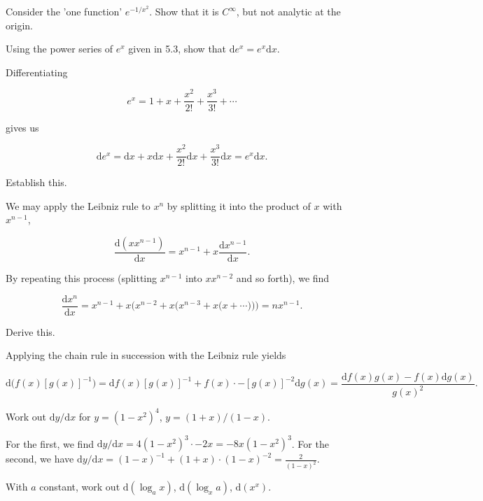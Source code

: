 \documentclass[../the-road-to-reality.tex]{subfiles}
\begin{document}
\begin{questions}
\question Consider the 'one function' $e^{-1/x^2}$. Show that it is $C^\infty$, but not analytic at the origin.

\question Using the power series of $e^x$ given in 5.3, show that $\mathrm{d}e^x = e^x\mathrm{d}x$.

\begin{solution}
	Differentiating
	
	\[
	e^x = 1 + x + \frac{x^2}{2!} + \frac{x^3}{3!} + \cdots
	\] 	

	gives us
	
	\[
	\mathrm{d}e^x = \mathrm{d}x + x\mathrm{d}x + \frac{x^2}{2!}\mathrm{d}x + \frac{x^3}{3!}\mathrm{d}x = e^x\mathrm{d}x
	.\] 
\end{solution}

\question Establish this.

\begin{solution}
	We may apply the Leibniz rule to $x^n$ by splitting it into the product of $x$ with $x^{n-1}$,
	
	\[
	\frac{\mathrm{d}(xx^{n-1})}{\mathrm{d}x} = x^{n-1} + x\frac{\mathrm{d}x^{n-1}}{\mathrm{d}x}
	.\] 
	
	By repeating this process (splitting $x^{n-1}$ into $xx^{n-2}$ and so forth), we find
	
	\[
		\frac{\mathrm{d}x^n}{\mathrm{d}x} = x^{n-1} + x\Big(x^{n-2} + x\Big(x^{n-3} + x\Big(x + \cdots\Big)\Big)\Big) = nx^{n-1}
	.\] 
\end{solution}

\question Derive this.

\begin{solution}
	Applying the chain rule in succession with the Leibniz rule yields 
	
	\[
	\mathrm{d}\big(f(x)[g(x)]^{-1}\big) = \mathrm{d}f(x)[g(x)]^{-1} + f(x)\cdot{-[g(x)]^{-2}}\mathrm{d}g(x) = \frac{\mathrm{d}f(x)g(x) - f(x)\mathrm{d}g(x)}{g(x)^2}
	.\] 
\end{solution}

\question Work out $\mathrm{d}y/\mathrm{d}x$ for $y = (1 - x^2)^4$, $y = (1 + x) / (1 - x)$.

\begin{solution}
	For the first, we find $\mathrm{d}y/\mathrm{d}x = 4(1 - x^2)^3\cdot{-2x} = -8x(1 - x^2)^3$. For the second, we have $\mathrm{d}y/\mathrm{d}x = (1-x)^{-1} + (1+x)\cdot{(1-x)^{-2}} = \frac{2}{(1-x)^{2}}$.
\end{solution}

\question With $a$ constant, work out $\mathrm{d}(\log_ax)$, $\mathrm{d}(\log_xa)$, $\mathrm{d}(x^x)$.


\end{questions}
\end{document}
